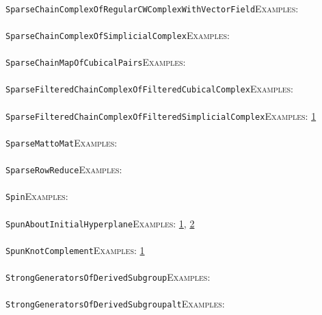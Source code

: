 \documentclass[a4paper,11pt]{report}
\begin{document}
{{ \\
 \texttt{SparseChainComplexOfRegularCWComplexWithVectorField}{\nobreakspace}{\nobreakspace}{\nobreakspace}{\nobreakspace}\textsc{Examples:} \\
 \\
 \texttt{SparseChainComplexOfSimplicialComplex}{\nobreakspace}{\nobreakspace}{\nobreakspace}{\nobreakspace}\textsc{Examples:} \\
 \\
 \texttt{SparseChainMapOfCubicalPairs}{\nobreakspace}{\nobreakspace}{\nobreakspace}{\nobreakspace}\textsc{Examples:} \\
 \\
 \texttt{SparseFilteredChainComplexOfFilteredCubicalComplex}{\nobreakspace}{\nobreakspace}{\nobreakspace}{\nobreakspace}\textsc{Examples:} \\
 \\
 \texttt{SparseFilteredChainComplexOfFilteredSimplicialComplex}{\nobreakspace}{\nobreakspace}{\nobreakspace}{\nobreakspace}\textsc{Examples:} \href{../www/SideLinks/About/aboutPersistent.html} {1}{\nobreakspace} \\
 \\
 \texttt{SparseMattoMat}{\nobreakspace}{\nobreakspace}{\nobreakspace}{\nobreakspace}\textsc{Examples:} \\
 \\
 \texttt{SparseRowReduce}{\nobreakspace}{\nobreakspace}{\nobreakspace}{\nobreakspace}\textsc{Examples:} \\
 \\
 \texttt{Spin}{\nobreakspace}{\nobreakspace}{\nobreakspace}{\nobreakspace}\textsc{Examples:} \\
 \\
 \texttt{SpunAboutInitialHyperplane}{\nobreakspace}{\nobreakspace}{\nobreakspace}{\nobreakspace}\textsc{Examples:} \href{tutorial/chap3.html} {1}{\nobreakspace}, \href{../www/SideLinks/About/aboutCoverinSpaces.html} {2}{\nobreakspace} \\
 \\
 \texttt{SpunKnotComplement}{\nobreakspace}{\nobreakspace}{\nobreakspace}{\nobreakspace}\textsc{Examples:} \href{../www/SideLinks/About/aboutCoverinSpaces.html} {1}{\nobreakspace} \\
 \\
 \texttt{StrongGeneratorsOfDerivedSubgroup}{\nobreakspace}{\nobreakspace}{\nobreakspace}{\nobreakspace}\textsc{Examples:} \\
 \\
 \texttt{StrongGeneratorsOfDerivedSubgroup{\textunderscore}alt}{\nobreakspace}{\nobreakspace}{\nobreakspace}{\nobreakspace}\textsc{Examples:} \\
}}
\end{document}
